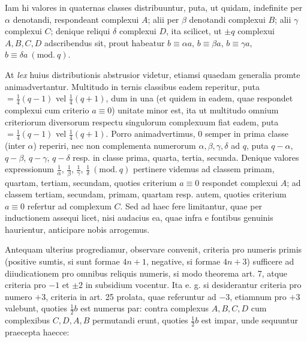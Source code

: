Iam hi valores in quaternas classes distribuuntur, puta, ut quidam, indefinite per $\alpha$ denotandi, respondeant complexui $A$; alii per $\beta$ denotandi complexui $B$; alii $\gamma$ complexui $C$; denique reliqui $\delta$ complexui $D$, ita scilicet, ut $\pm q$ complexui $A,B,C,D$ adscribendus sit, prout habeatur $b\equiv\alpha a$, $b\equiv\beta a$, $b\equiv\gamma a$, $b\equiv\delta a\ (\mathrm{mod.}\ q)$.

At \emph{lex} huius distributionis abstrusior videtur, etiamsi quaedam generalia promte animadvertantur. Multitudo in ternis classibus eadem reperitur, puta $=\frac14(q-1)$ vel $\frac14(q+1)$, dum in una (et quidem in eadem, quae respondet complexui cum criterio $a\equiv0$) unitate minor est, ita ut multitudo omnium criteriorum diversorum respectu singulorum complexuum fiat eadem, puta $=\frac14(q-1)$ vel $\frac14(q+1)$. Porro animadvertimus, $0$ semper in prima classe (inter $\alpha$) reperiri, nec non complementa numerorum $\alpha,\beta,\gamma,\delta$ ad $q$, puta $q-\alpha$, $q-\beta$, $q-\gamma$, $q-\delta$ resp. in classe prima, quarta, tertia, secunda. Denique valores expressionum $\frac1\alpha$, $\frac1\beta$, $\frac1\gamma$, $\frac1\delta\ (\mathrm{mod.}\ q)$ pertinere videmus ad classem primam, quartam, tertiam, secundam, quoties criterium $a\equiv0$ respondet complexui $A$; ad classem tertiam, secundam, primam, quartam resp. autem, quoties criterium $a\equiv0$ refertur ad complexum $C$. Sed ad haec fere limitantur, quae per inductionem assequi licet, nisi audacius ea, quae infra e fontibus genuinis haurientur, anticipare nobis arrogemus.

Antequam ulterius progrediamur, observare convenit, criteria pro numeris primis (positive sumtis, si sunt formae $4n+1$, negative, si formae $4n+3$) sufficere ad diiudicationem pro omnibus reliquis numeris, si modo theorema art. 7, atque criteria pro $-1$ et $\pm2$ in subsidium vocentur. Ita e. g. si desiderantur criteria pro numero $+3$, criteria in art. 25 prolata, quae referuntur ad $-3$, etiamnum pro $+3$ valebunt, quoties $\frac12b$ est numerus par: contra complexus $A,B,C,D$ cum complexibus $C,D,A,B$ permutandi erunt, quoties $\frac12b$ est impar, unde sequuntur praecepta haecce:

